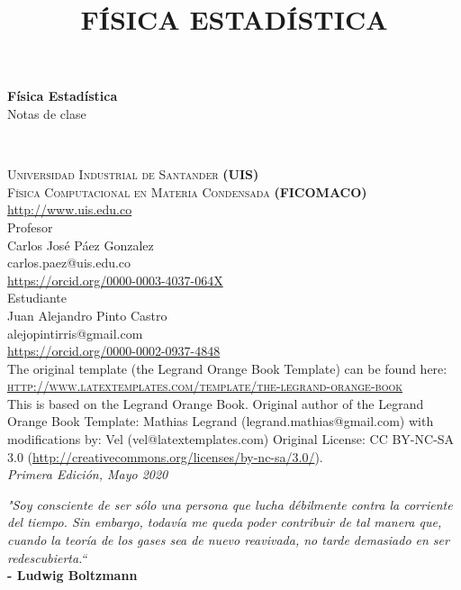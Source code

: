 \documentclass[11pt,fleqn]{book}
\begin{document}
\title{FÍSICA ESTADÍSTICA}
\begingroup
\thispagestyle{empty}
\centering
\vspace*{5cm}
\par\normalfont\fontsize{35}{35}\sffamily\selectfont
\textbf{Física Estadística}\\
{\LARGE Notas de clase}\par
\vspace*{1cm}
\endgroup
\newpage
~\vfill
\thispagestyle{empty}

\noindent \textsc{Universidad Industrial de Santander \textbf{(UIS)} \\
Física Computacional en Materia Condensada  \textbf{(FICOMACO)}}\\
\url{http://www.uis.edu.co}\\

\noindent Profesor\\
Carlos José Páez Gonzalez\\
carlos.paez@uis.edu.co\\
\url{https://orcid.org/0000-0003-4037-064X}\\

\noindent Estudiante\\
Juan Alejandro Pinto Castro\\
alejopintirris@gmail.com\\
\url{https://orcid.org/0000-0002-0937-4848}\\

\noindent The original template (the Legrand Orange Book Template) can be found here:\\
\noindent \textsc{\url{http://www.latextemplates.com/template/the-legrand-orange-book}}\\ %

\noindent  This is based on the Legrand Orange Book. Original author of the Legrand Orange Book Template: Mathias Legrand (legrand.mathias@gmail.com) with modifications by: Vel (vel@latextemplates.com)
Original License: CC BY-NC-SA 3.0 (\url{http://creativecommons.org/licenses/by-nc-sa/3.0/}).\\ %

\noindent \textit{Primera Edición, Mayo 2020} %
\newpage
~\vfill
\thispagestyle{empty}
\noindent \begin{flushright}
\emph{"Soy consciente de ser sólo una persona que lucha débilmente contra la corriente del tiempo. Sin embargo, todavía me queda poder contribuir de tal manera que, cuando la teoría de los gases sea de nuevo reavivada, no tarde demasiado en ser redescubierta.“}\\
\vspace{3mm}
\textbf{- Ludwig Boltzmann}
\end{flushright}
\end{document}
